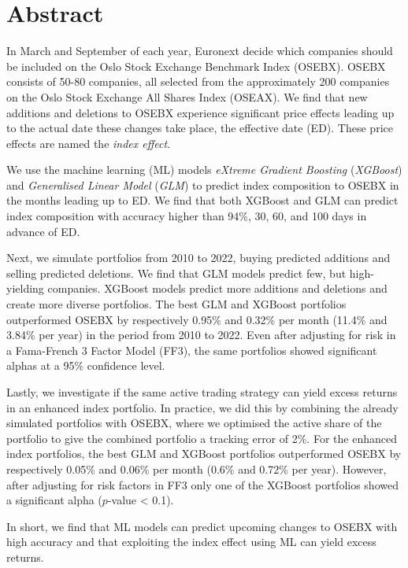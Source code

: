 \section*{Abstract}

In March and September of each year, Euronext decide which companies should be included on the Oslo Stock Exchange Benchmark Index (OSEBX). OSEBX consists of 50-80 companies, all selected from the approximately 200 companies on the Oslo Stock Exchange All Shares Index (OSEAX). We find that new additions and deletions to OSEBX experience significant price effects leading up to the actual date these changes take place, the effective date (ED). These price effects are named the \textit{index effect}.

We use the machine learning (ML) models \textit{eXtreme Gradient Boosting} (\textit{XGBoost}) and \textit{Generalised Linear Model} (\textit{GLM}) to predict index composition to OSEBX in the months leading up to ED. We find that both XGBoost and GLM can predict index composition with accuracy higher than 94\%, 30, 60, and 100 days in advance of ED.

Next, we simulate portfolios from 2010 to 2022, buying predicted additions and selling predicted deletions. We find that GLM models predict few, but high-yielding companies. XGBoost models predict more additions and deletions and create more diverse portfolios. The best GLM and XGBoost portfolios outperformed OSEBX by respectively 0.95\% and 0.32\% per month (11.4\% and 3.84\% per year) in the period from 2010 to 2022. Even after adjusting for risk in a Fama-French 3 Factor Model (FF3), the same portfolios showed significant alphas at a 95\% confidence level.

Lastly, we investigate if the same active trading strategy can yield excess returns in an enhanced index portfolio. In practice, we did this by combining the already simulated portfolios with OSEBX, where we optimised the active share of the portfolio to give the combined portfolio a tracking error of 2\%. For the enhanced index portfolios, the best GLM and XGBoost portfolios outperformed OSEBX by respectively 0.05\% and 0.06\% per month (0.6\% and 0.72\% per year). However, after adjusting for risk factors in FF3 only one of the XGBoost portfolios showed a significant alpha ($p$-value < 0.1).

In short, we find that ML models can predict upcoming changes to OSEBX with high accuracy and that exploiting the index effect using ML can yield excess returns. 


